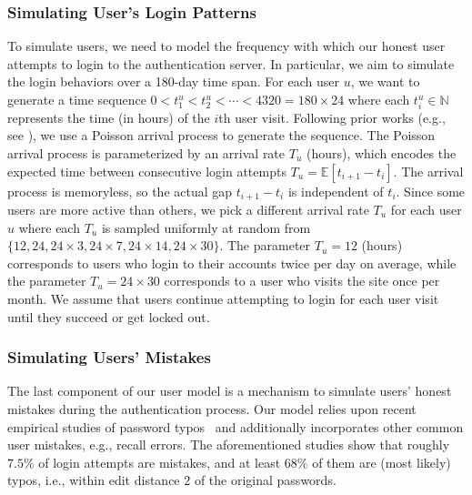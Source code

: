 \subsubsection{Simulating User's Login Patterns}\label{section:ExperimentDesign-subsection:SimulateUser-subsubsection:SimulateLoginPattern} %
\vspace*{-\baselineskip}
To simulate users, we need to model the frequency with which our honest user attempts to login to the authentication server. In particular, we aim to simulate the login behaviors over a 180-day time span. For each user $u$, we want to generate a time sequence $0 < t_1^u < t_2^u < \cdots < 4320 = 180\times24$ where each $t_i^u \in \mathbb{N}$ represents the time (in hours) of the $i$th user visit. Following prior works (e.g., see \cite{AC:BloBluDat13,CCS:KogManBon17}), we use a Poisson arrival process to generate the sequence. The Poisson arrival process is parameterized by an arrival rate $T_u$ (hours), which encodes the expected time between consecutive login attempts $T_u = \mathbb{E}[t_{i+1}-t_i]$. The arrival process is memoryless, so the actual gap $t_{i+1}-t_i$  is independent of $t_i$. Since some users are more active than others, we pick a different arrival rate $T_u$ for each user $u$ where each $T_u$ is sampled uniformly at random from $\{ 12, 24, 24 \times 3, 24 \times 7, 24 \times 14, 24 \times 30\}$. The parameter $T_u = 12$ (hours) corresponds to users who login to their accounts twice per day on average, while the parameter $T_u = 24 \times 30$ corresponds to a user who visits the site once per month. We assume that users continue attempting to login for each user visit until they succeed or get locked out. 



\vspace*{-\baselineskip}
\vspace*{-\baselineskip}
\subsubsection{Simulating Users' Mistakes}\label{section:ExperimentDesign-subsection:SimulateUser-subsubsection:SimulateUserMistake} %
\vspace*{-\baselineskip}
The last component of our user model is a mechanism to simulate users’ honest mistakes during the authentication process. Our model relies upon recent empirical studies of password typos~\cite{CCS:CWPCR17,SP:CAAJR16} and additionally incorporates other common user mistakes, e.g., recall errors. The aforementioned studies show that roughly $7.5\%$ of login attempts are mistakes, and at least $68\%$ of them are (most likely) typos, i.e., within edit distance $2$ of the original passwords.  



